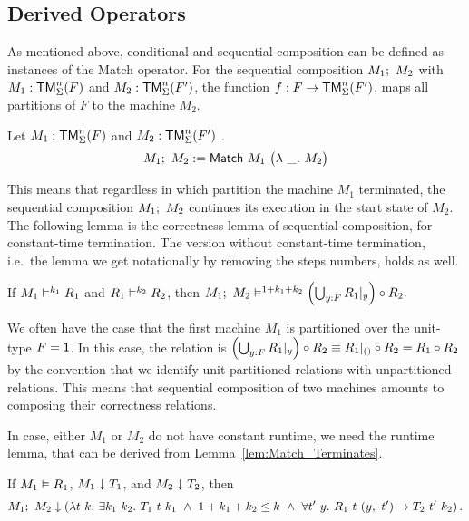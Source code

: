 \subsection{Derived Operators}
\label{sec:match-derived-operators}

As mentioned above, conditional and sequential composition can be defined as instances of the Match operator.  For the sequential composition
$M_1 ;~ M_2$ with $M_1 : \mathsf{TM}_\Sigma^n(F)$ and $M_2 : \mathsf{TM}_\Sigma^n(F')$, the function $f : F \rightarrow \mathsf{TM}_\Sigma^n(F')$, maps all partitions of $F$ to the
machine $M_2$.
\begin{definition}
  \label{def:Seq}
  Let $M_1 : \mathsf{TM}_\Sigma^n(F)$ and $M_2 : \mathsf{TM}_\Sigma^n(F')$ .
  \[
    M_1 ;~ M_2 := \mathsf{Match}~M_1~
    \bigl(
    \lambda~\_.~M_2
    \bigr)
  \]
\end{definition}
This means that regardless in which partition the machine $M_1$ terminated, the sequential composition $M_1 ;~ M_2$ continues its execution in the
start state of $M_2$.  The following lemma is the correctness lemma of sequential composition, for constant-time termination.  The version without
constant-time termination, i.e.\ the lemma we get notationally by removing the steps numbers, holds as well.

\begin{lemma}
  \label{lem:Seq_RealiseIn}
  If $M_1 \mathrel{\vDash^{k_1}} R_1$ and $R_1 \mathrel{\vDash^{k_2}} R_2$, then
  $
  M_1 ;~ M_2 \mathrel{\vDash^{1+k_1+k_2}} \left(\bigcup_{y:F} R_1{|}_{y}\right) \circ R_2.
  $
\end{lemma}

We often have the case that the first machine $M_1$ is partitioned over the unit-type $F = \mathsf{1}$.  In this case, the relation is
$\left(\bigcup_{y:F} R_1{|}_{y}\right) \circ R_2 \equiv R_1 {|}_{\mathsf{()}} \circ R_2 = R_1 \circ R_2$ by the convention that we identify unit-partitioned
relations with unpartitioned relations.  This means that sequential composition of two machines amounts to composing their correctness relations.

In case, either $M_1$ or $M_2$ do not have constant runtime, we need the runtime lemma, that can be derived from Lemma~\ref{lem:Match_Terminates}.
\begin{lemma}
  \label{lem:Seq_TerminatesIn}
  If $M_1 \mathrel{\vDash} R_1$, $M_1 \mathrel{\downarrow} T_1$, and $M_2 \mathrel{\downarrow} T_2$, then
  \[
    M_1 \Seq M_2 \TerminatesIn
    \left(%
      \lambda t~k.~\exists k_1~k_2.~T_1~t~k_1 ~\land~ 1 + k_1 + k_2 \leq k ~\land~ \forall t'~y.~R_1~t~(y,~t') \rightarrow T_2~t'~k_2 %
    \right).
  \]
\end{lemma}


